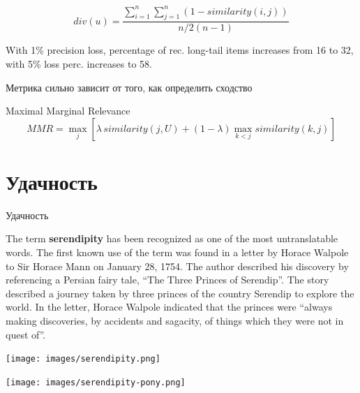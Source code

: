 \documentclass[11pt,aspectratio=169,handout]{beamer}
\begin{document}
\begin{frame}

\[
div(u) = \frac{\sum_{i=1}^n \sum_{j=1}^n (1 - similarity(i, j))}{n/2 (n-1)} 
\]

\vfill

\begin{tcolorbox}[colback=gray!5,colframe=gray!80,title=]
With 1\% precision loss, percentage of rec. long-tail items increases from 16 to 32, with 5\% loss perc. increases to 58.
\end{tcolorbox}

\vfill

\begin{tcolorbox}[colback=warn!5,colframe=warn!80,title=]
Метрика сильно зависит от того, как определить сходство
\end{tcolorbox}

\end{frame}

\begin{frame}
Maximal Marginal Relevance \cite{CARBONELL}
\[
MMR = \max_j \left[ \lambda \, similarity(j, U) + (1 - \lambda) \max_{k < j} similarity(k, j) \right]
\]
\end{frame}

\section{Удачность}

\begin{frame}{Удачность}

The term {\bf serendipity} has been recognized as one of the most untranslatable words. 
The first known use of the term was found in a letter by Horace Walpole to Sir Horace Mann on January 28, 1754. 
The author described his discovery by referencing a Persian fairy tale, ``The Three Princes of Serendip''. 
The story described a journey taken by three princes of the country Serendip to explore the world. 
In the letter, Horace Walpole indicated that the princes were ``always making discoveries, by accidents and sagacity, of things which they were not in quest of''. \cite{KOTKOV}

\begin{center}
\texttt{[image: images/serendipity.png]}
\end{center}

\end{frame}

\begin{frame}{}
\begin{center}
\texttt{[image: images/serendipity-pony.png]}
\end{center}
\end{frame}
\end{document}
